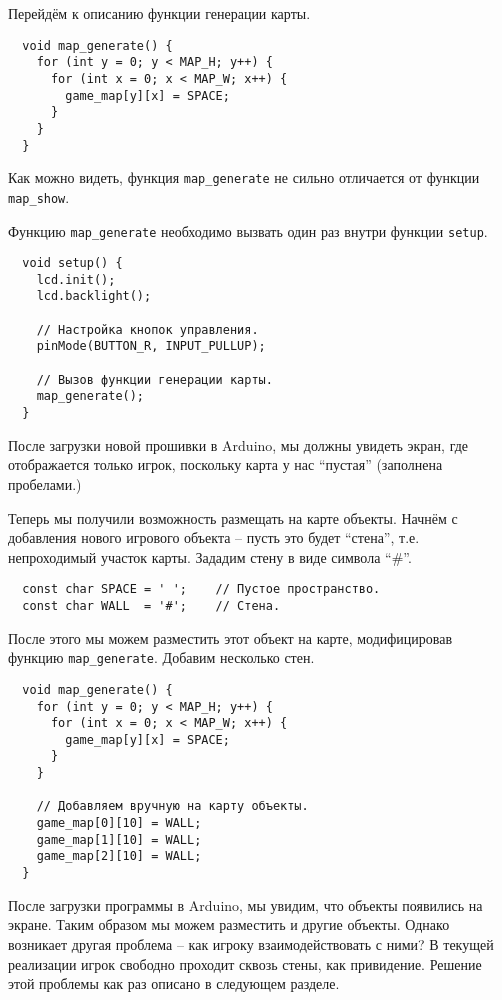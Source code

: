 \documentclass[../sparc.tex]{subfiles}
\begin{document}
Перейдём к описанию функции генерации карты.

\begin{verbatim}
  void map_generate() {
    for (int y = 0; y < MAP_H; y++) {
      for (int x = 0; x < MAP_W; x++) {
        game_map[y][x] = SPACE;
      }
    }
  }
\end{verbatim}

Как можно видеть, функция \texttt{map\_generate} не сильно отличается от функции
\texttt{map\_show}.

Функцию \texttt{map\_generate} необходимо вызвать один раз внутри функции
\texttt{setup}.

\begin{verbatim}
  void setup() {
    lcd.init();
    lcd.backlight();

    // Настройка кнопок управления.
    pinMode(BUTTON_R, INPUT_PULLUP);

    // Вызов функции генерации карты.
    map_generate();
  }
\end{verbatim}

После загрузки новой прошивки в Arduino, мы должны увидеть экран, где
отображается только игрок, поскольку карта у нас ``пустая'' (заполнена
пробелами.)

Теперь мы получили возможность размещать на карте объекты.  Начнём с добавления
нового игрового объекта -- пусть это будет ``стена'', т.е. непроходимый участок
карты.  Зададим стену в виде символа ``\#''.

\begin{verbatim}
  const char SPACE = ' ';    // Пустое пространство.
  const char WALL  = '#';    // Стена.
\end{verbatim}

После этого мы можем разместить этот объект на карте, модифицировав функцию
\texttt{map\_generate}.  Добавим несколько стен.

\begin{verbatim}
  void map_generate() {
    for (int y = 0; y < MAP_H; y++) {
      for (int x = 0; x < MAP_W; x++) {
        game_map[y][x] = SPACE;
      }
    }

    // Добавляем вручную на карту объекты.
    game_map[0][10] = WALL;
    game_map[1][10] = WALL;
    game_map[2][10] = WALL;
  }
\end{verbatim}

После загрузки программы в Arduino, мы увидим, что объекты появились на экране.
Таким образом мы можем разместить и другие объекты.  Однако возникает другая
проблема -- как игроку взаимодействовать с ними?  В текущей реализации игрок
свободно проходит сквозь стены, как привидение.  Решение этой проблемы как раз
описано в следующем разделе.
\end{document}

